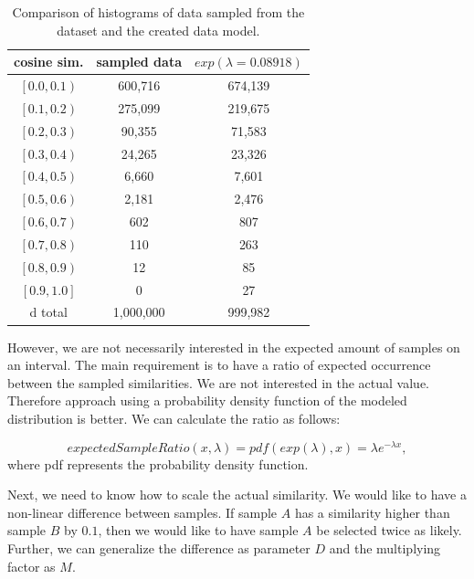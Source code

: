 \begin{table}[!ht]
    \centering
    \begin{tabular}{ c | c | c}
       cosine sim. & sampled data & $exp(\lambda=0.08918)$ \\
        \hline
        $\left[ 0.0, 0.1\right)$ & 600,716 & 674,139 \\
        $\left[ 0.1, 0.2\right)$ & 275,099 & 219,675 \\
        $\left[ 0.2, 0.3\right)$ & 90,355 & 71,583 \\
        $\left[ 0.3, 0.4\right)$ & 24,265 & 23,326 \\
        $\left[ 0.4, 0.5\right)$ & 6,660 & 7,601 \\
        $\left[ 0.5, 0.6\right)$ & 2,181 & 2,476 \\
        $\left[ 0.6, 0.7\right)$ & 602 & 807 \\
        $\left[ 0.7, 0.8\right)$ & 110 & 263 \\
        $\left[ 0.8, 0.9\right)$ & 12 & 85 \\
        $\left[ 0.9, 1.0\right]$ & 0 & 27 \\d
        total & 1,000,000 & 999,982
            
    \end{tabular}
    \caption{Comparison of histograms of data sampled from the dataset and the created data model.}
    \label{table:5.3_modeled_comparison}
\end{table}

However, we are not necessarily interested in the expected amount of samples on an interval. The main requirement is to have a ratio of expected occurrence between the sampled similarities. We are not interested in the actual value. Therefore approach using a probability density function of the modeled distribution is better. We can calculate the ratio as follows:

\begin{equation}
    expectedSampleRatio(x, \lambda) = pdf(exp(\lambda), x) = \lambda e ^{-\lambda x},
\end{equation}
where pdf represents the probability density function.

Next, we need to know how to scale the actual similarity. We would like to have a non-linear difference between samples. If sample $A$ has a similarity higher than sample $B$ by $0.1$, then we would like to have sample $A$ be selected twice as likely. Further, we can generalize the difference as parameter $D$ and the multiplying factor as $M$.

